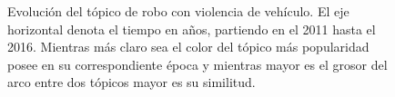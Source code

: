 \begin{figure}
\caption{Evolución del tópico de robo con violencia de vehículo. El eje horizontal denota el tiempo en años, partiendo en el 2011 hasta el 2016. Mientras más claro sea el color del tópico más popularidad posee en su correspondiente época y mientras mayor es el grosor del arco entre dos tópicos mayor es su similitud.}
\label{img:violence_topic}
\end{figure}


